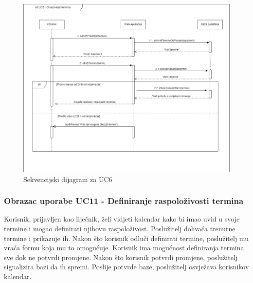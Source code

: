 				\begin{figure}[H]
			            \includegraphics[width=\textwidth]{slike/sd_uc6.png} %
			            \caption{Sekvencijski dijagram za UC6}
			            \label{fig:promjene2} %
		        \end{figure}
		            
		        \eject
		            
		            
				\subsubsection{Obrazac uporabe UC11 - Definiranje raspoloživosti termina}
				
				Korisnik, prijavljen kao liječnik, želi vidjeti kalendar kako bi imao uvid u svoje termine i mogao definirati njihovu raspoloživost. Poslužitelj dohvaća trenutne termine i prikazuje ih. Nakon što korisnik odluči definirati termine, poslužitelj mu vraća formu koja mu to omogućuje. Korisnik ima mogućnost definiranja termina sve dok ne potvrdi promjene. Nakon što korisnik potvrdi promjene, poslužitelj signalizira bazi da ih spremi. Poslije potvrde baze, poslužitelj osvježava korisnikov kalendar.
				
